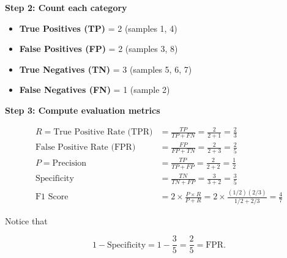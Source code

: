 \documentclass{article}
\begin{document}
\begin{enumerate}
\textbf{Step 2: Count each category}

\begin{itemize}
    \item \textbf{True Positives (TP)} = 2 (samples 1, 4)
    \item \textbf{False Positives (FP)} = 2 (samples 3, 8)
    \item \textbf{True Negatives (TN)} = 3 (samples 5, 6, 7)
    \item \textbf{False Negatives (FN)} = 1 (sample 2)
\end{itemize}

\textbf{Step 3: Compute evaluation metrics}

\[
\begin{aligned}
R=\text{True Positive Rate (TPR)} &= \frac{TP}{TP + FN} = \frac{2}{2 + 1} = \frac{2}{3} \\[6pt]
\text{False Positive Rate (FPR)} &= \frac{FP}{FP + TN} = \frac{2}{2 + 3} = \frac{2}{5} \\[6pt]
P=\text{Precision} &= \frac{TP}{TP + FP} = \frac{2}{2 + 2} = \frac{1}{2} \\[6pt]
\text{Specificity} &= \frac{TN}{TN + FP} = \frac{3}{3 + 2} = \frac{3}{5} \\[6pt]
\text{F1 Score} &= 2\times\frac{P\times R}{P + R} 
= 2\times\frac{(1/2)(2/3)}{1/2 + 2/3}
= \frac{4}{7}
\end{aligned}
\]

Notice that

\[
1-\text{Specificity} = 1-\frac{3}{5} = \frac{2}{5} = \text{FPR}.
\]


\end{enumerate}
\end{document}

